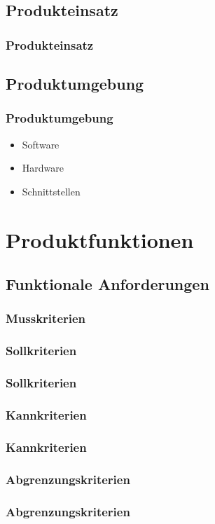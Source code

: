 \documentclass{beamer}
\begin{document}
\subsection{Produkteinsatz}
\begin{frame}
\frametitle{Produkteinsatz}
\end{frame}

\subsection{Produktumgebung}
\begin{frame}
\frametitle{Produktumgebung}
\begin{itemize}
\item Software
\item Hardware
\item Schnittstellen
\end{itemize}
\end{frame}


\section{Produktfunktionen}
\subsection{Funktionale Anforderungen}
\begin{frame}
\frametitle{Musskriterien}
\end{frame}

\subsubsection{Sollkriterien}
\begin{frame}
\frametitle{Sollkriterien}
\end{frame}

\subsubsection{Kannkriterien}
\begin{frame}
\frametitle{Kannkriterien}
\end{frame}
\subsubsection{Abgrenzungskriterien}
\begin{frame}
\frametitle{Abgrenzungskriterien}
\end{frame}
\end{document}
